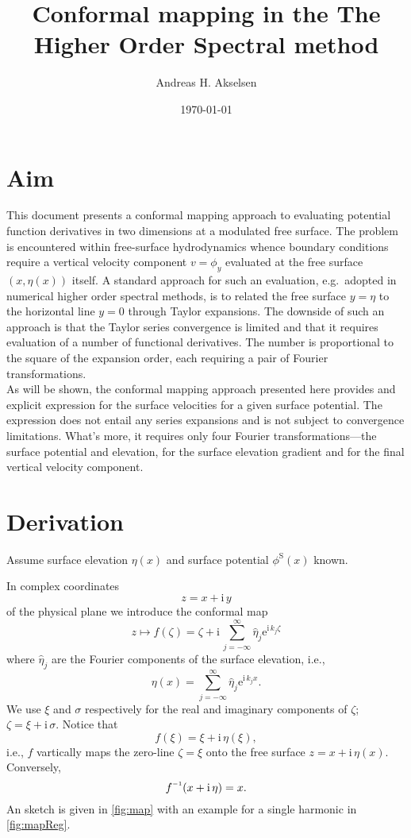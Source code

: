 \documentclass[a4paper,12pt]{article}
\newcommand{\mr}{\mathrm}
\renewcommand{\S}{^\mr{S}}
\newcommand{\ii}{\mr{i}\,}
\newcommand{\ee}{\mr{e}}
\renewcommand{\_}[1]{_\mr{#1}}
\newcommand{\h}{\hat}
\newcommand{\z}{z}
\newcommand{\x}{x}
\newcommand{\y}{y}
\newcommand{\zz}{\zeta}
\newcommand{\xx}{\xi}
\newcommand{\yy}{\sigma}
\newcommand{\zmap}{f}
\newcommand{\zzmap}{\zmap^{\raisebox{.2ex}{$\scriptscriptstyle-1$}}}
\newcommand{\surf}{\eta}
\begin{document}
\title{Conformal mapping in the The Higher Order Spectral method}
\author{Andreas H. Akselsen}
\date{\today}
\maketitle


\section{Aim}
This document presents a conformal mapping approach to evaluating potential function derivatives in two dimensions at a modulated free surface.
The problem is encountered within free-surface hydrodynamics whence boundary conditions require a vertical velocity component $v=\phi_y$ evaluated at the free surface $(\x,\surf(\x))$ itself.
A standard approach for such an evaluation, e.g.\ adopted in numerical higher order spectral methods, is to related the free surface $\y=\surf$ to the horizontal line $\y=0$ through Taylor expansions.
The downside of such an approach is that the Taylor series convergence is limited \citep{west1981deep} and that it requires evaluation of a number of functional derivatives.
The number is proportional to the square of the expansion order, each requiring a pair of Fourier transformations.
\\

As will be shown, the conformal mapping approach presented here provides and explicit expression for the surface velocities for a given surface potential.
The expression does not entail any series expansions and is not subject to convergence limitations.
What's more, it requires only four Fourier transformations---the surface potential and elevation, for the surface elevation gradient and for the final vertical velocity component.

\section{Derivation}
Assume surface elevation $\surf(\x)$ and surface potential $\phi\S(\x)$ known.

In complex coordinates
\[  \z = \x+\ii\y \]
of the physical plane
we introduce the conformal map
\begin{equation}
\z\mapsto\zmap(\zz) = \zz + \ii \sum_{j=-\infty}^\infty\h\surf_j \ee^{\ii k_j \zz}
\label{eq:map}
\end{equation}
where $\h\surf_j$ are the Fourier components of the surface elevation, i.e.,\
\[
\surf(\x) = \sum_{j=-\infty}^\infty\h\surf_j \ee^{\ii k_j \x}.
\]
We use $\xx$ and $\yy$ respectively for the real and imaginary components of $\zz$; $\zz = \xx+\ii\yy$.
Notice that 
\begin{equation}
\zmap(\xx) = \xx+\ii \surf(\xx),
\label{eq:mapXi}
\end{equation}
i.e., $\zmap$ vartically  maps the zero-line $\zz=\xx$ onto the free surface $\z=\x+\ii\eta(\x)$.
Conversely,
\begin{equation}
\zzmap(\x+\ii\surf) = \x.
\label{eq:invMap}
\end{equation}
An sketch is given in \autoref{fig:map} with an example for a single harmonic in \autoref{fig:mapReg}.
\end{document}
